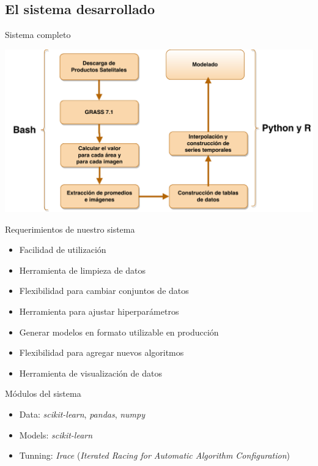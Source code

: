 \documentclass[10pt]{beamer}
\begin{document}
\subsection{El sistema desarrollado}


\begin{frame}{Sistema completo}
  \begin{center}
    \includegraphics[width=1\textwidth]{sistema_datos}
  \end{center}
\end{frame}


\begin{frame}{Requerimientos de nuestro sistema}
  \begin{itemize}[<+->]
    \item Facilidad de utilización
    \item Herramienta de limpieza de datos
    \item Flexibilidad para cambiar conjuntos de datos
    \item Herramienta para ajustar hiperparámetros
    \item Generar modelos en formato utilizable en producción
    \item Flexibilidad para agregar nuevos algoritmos
    \item Herramienta de visualización de datos
  \end{itemize}
\end{frame}

\begin{frame}{Módulos del sistema}
  \begin{itemize}[<+->]
    \item Data: \textit{scikit-learn}, \textit{pandas}, \textit{numpy}
    \item Models: \textit{scikit-learn}
    \item Tunning: \textit{Irace} (\textit{Iterated Racing for Automatic Algorithm Configuration})
  \end{itemize}
\end{frame}
\end{document}
